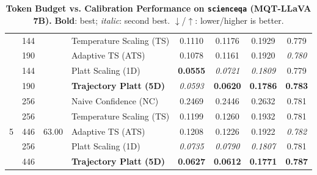 \begin{table}[t]
\begin{tabular}{ccclcccc}
 & 144 &  & Temperature Scaling (TS) & 0.1110 & 0.1176 & 0.1929 & 0.779 \\
 & 190 &  & Adaptive TS (ATS) & 0.1078 & 0.1161 & 0.1920 & \textit{0.780} \\
 & 144 &  & Platt Scaling (1D) & \textbf{0.0555} & \textit{0.0721} & \textit{0.1809} & 0.779 \\
 & 190 &  & \textbf{Trajectory Platt (5D)} & \textit{0.0593} & \textbf{0.0620} & \textbf{0.1786} & \textbf{0.783} \\
\midrule
\multirow{5}{*}{5} & 256 & \multirow{5}{*}{63.00} & Naive Confidence (NC) & 0.2469 & 0.2446 & 0.2632 & 0.781 \\
 & 256 &  & Temperature Scaling (TS) & 0.1199 & 0.1260 & 0.1932 & 0.781 \\
 & 446 &  & Adaptive TS (ATS) & 0.1208 & 0.1226 & 0.1922 & \textit{0.782} \\
 & 256 &  & Platt Scaling (1D) & \textit{0.0735} & \textit{0.0790} & \textit{0.1807} & 0.781 \\
 & 446 &  & \textbf{Trajectory Platt (5D)} & \textbf{0.0627} & \textbf{0.0612} & \textbf{0.1771} & \textbf{0.787} \\
\bottomrule
\end{tabular}
\caption{\textbf{Token Budget vs. Calibration Performance on \texttt{scienceqa} (MQT-LLaVA 7B).} \textbf{Bold}: best; \textit{italic}: second best. $\downarrow$/$\uparrow$: lower/higher is better.}
\label{tab:token_budget_scienceqa_mqt}
\end{table}
